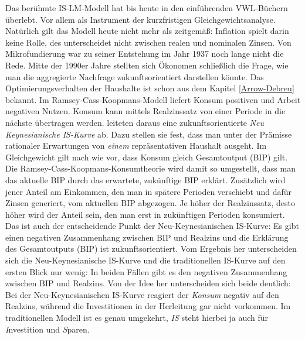 Das berühmte IS-LM-Modell hat bis heute in den einführenden VWL-Büchern überlebt. Vor allem als Instrument der kurzfristigen Gleichgewichtsanalyse. Natürlich gilt das Modell heute nicht mehr als zeitgemäß: Inflation spielt darin keine Rolle, des unterscheidet nicht zwischen realen und nominalen Zinsen. Von Mikrofundierung war zu seiner Entstehung im Jahr 1937 noch lange nicht die Rede. Mitte der 1990er Jahre stellten sich Ökonomen schließlich die Frage, wie man die aggregierte Nachfrage zukunftsorientiert darstellen könnte. Das Optimierungsverhalten der Haushalte ist schon aus dem Kapitel \ref{Arrow-Debreu} bekannt. Im Ramsey-Cass-Koopmans-Modell liefert Konsum positiven und Arbeit negativen Nutzen. Konsum kann mittels Realzinssatz von einer Periode in die nächste übertragen werden. \textcite{Kerr1996, McCallum1999} leiteten daraus eine zukunftsorientierte \textit{Neu Keynesianische IS-Kurve} ab. Dazu stellen sie fest, dass man unter der Prämisse rationaler Erwartungen von \textit{einem} repräsentativen Haushalt ausgeht. Im Gleichgewicht gilt nach wie vor, dass Konsum gleich Gesamtoutput (BIP) gilt. Die Ramsey-Cass-Koopmans-Konsumtheorie wird damit so umgestellt, dass man das aktuelle BIP durch das erwartete, zukünftige BIP erklärt. Zusätzlich wird jener Anteil am Einkommen, den man in spätere Perioden verschiebt und dafür Zinsen generiert, vom aktuellen BIP abgezogen. Je höher der Realzinssatz, desto höher wird der Anteil sein, den man erst in zukünftigen Perioden konsumiert. Das ist auch der entscheidende Punkt der Neu-Keynesianischen IS-Kurve: Es gibt einen negativen Zusammenhang zwischen BIP und Realzins und die Erklärung des Gesamtoutputs (BIP) ist zukunftsorientiert. Vom Ergebnis her unterscheiden sich die Neu-Keynesianische IS-Kurve und die traditionellen IS-Kurve auf den ersten Blick nur wenig: In beiden Fällen gibt es den negativen Zusammenhang zwischen BIP und Realzins. Von der Idee her \parencite[S. 241]{Romer2019} unterscheiden sich beide deutlich: Bei der Neu-Keynesianischen IS-Kurve reagiert der \textit{Konsum} negativ auf den Realzins, während die Investitionen in der Herleitung gar nicht vorkommen. Im traditionellen Modell ist es genau umgekehrt, \textit{IS} steht hierbei ja auch für \textit{I}nvestition und \textit{S}paren. 
